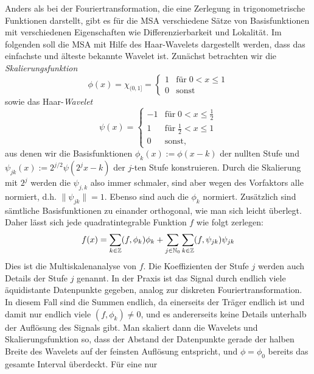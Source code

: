 Anders als bei der Fouriertransformation, die eine Zerlegung in
trigonometrische Funktionen darstellt, gibt es für die MSA
verschiedene Sätze von Basisfunktionen mit verschiedenen Eigenschaften
wie Differenzierbarkeit und Lokalität. Im folgenden soll die MSA mit
Hilfe des Haar-Wavelets dargestellt werden, dass das einfachste und
älteste bekannte Wavelet ist. Zunächst betrachten wir die
\emph{Skalierungsfunktion}
\begin{equation}
  \phi(x) = \chi_{(0,1]} =
  \begin{cases}
    1 &\text{für}\; 0 < x \le 1\\
    0 &\text{sonst}
  \end{cases}
\end{equation}
sowie das Haar-\emph{Wavelet}
\begin{equation}
  \psi(x) =
  \begin{cases}
    -1 &\text{für}\; 0 < x \le \frac{1}{2}\\
    1 &\text{für}\; \frac{1}{2} < x \le 1 \\
    0 &\text{sonst},
  \end{cases}
\end{equation}
aus denen wir die Basisfunktionen $\phi_k(x) := \phi(x - k)$ der nullten
Stufe und $\psi_{jk}(x) := 2^{j/2}\psi(2^jx-k)$ der $j$-ten Stufe
konstruieren. Durch die Skalierung mit $2^j$ werden die $\psi_{j,k}$
also immer schmaler, sind aber wegen des Vorfaktors alle normiert,
d.h. $\lVert \psi_{jk} \rVert = 1$. Ebenso sind auch die $\phi_k$
normiert. Zusätzlich sind sämtliche Basisfunktionen zu einander
orthogonal, wie man sich leicht überlegt. Daher lässt sich jede
quadratintegrable Funktion $f$ wie folgt zerlegen:
\begin{equation}
  f(x) = \sum_{k\in\mathbb{Z}} (f,\phi_k)\phi_k + \sum_{j\in\mathbb{N}_0}
  \sum_{k\in\mathbb{Z}} (f,\psi_{jk})\psi_{jk}
\end{equation}
Dies ist die Multiskalenanalyse von $f$. Die Koeffizienten der Stufe
$j$ werden auch Details der Stufe $j$ genannt. In der Praxis ist das
Signal durch endlich viele äquidistante Datenpunkte gegeben, analog
zur diskreten Fouriertransformation. In diesem Fall sind die Summen
endlich, da einerseits der Träger endlich ist und damit nur endlich
viele $(f,\phi_k)\neq 0$, und es andererseits keine Details unterhalb
der Auflösung des Signals gibt. Man skaliert dann die Wavelets und
Skalierungsfunktion so, dass der Abstand der Datenpunkte gerade der
halben Breite des Wavelets auf der feinsten Auflösung entspricht, und
$\phi = \phi_0$ bereits das gesamte Interval überdeckt. Für eine nur
